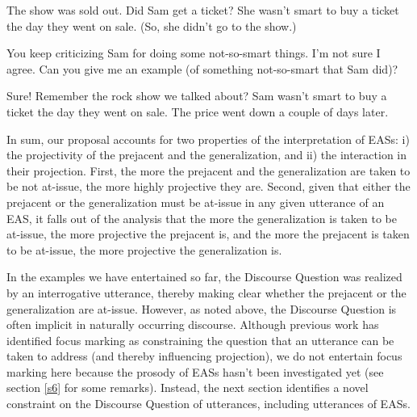 \documentclass[11pt,fleqn]{article}
\newcommand{\6}{\mbox{$[\hspace*{-.6mm}[$}}
\newcommand{\9}{\mbox{$]\hspace*{-.6mm}]$}}
\begin{document}
\begin{exe}
\ex\label{ai2}

\begin{xlist}
\ex
\begin{xlist}
 The show was sold out. Did Sam get a ticket?
 She wasn't smart to buy a ticket the day they went on sale. (So, she didn't go to the show.)
\end{xlist}

\ex
\begin{xlist}

 You keep criticizing Sam for doing some not-so-smart things. I'm not sure I agree. Can you give me an example (of something not-so-smart that Sam did)?


 Sure! Remember the rock show we talked about? Sam wasn't smart to buy a ticket the day they went on sale. The price went down a couple of days later.

%

\end{xlist}

\end{xlist}
\end{exe}
In sum, our proposal accounts for two properties of the interpretation of EASs: i) the projectivity of the prejacent and the generalization, and ii) the interaction in their projection. First, the more the prejacent and the generalization are taken to be not at-issue, the more highly projective they are. Second, given that either the prejacent or the generalization must be at-issue in any given utterance of an EAS, it falls out of the analysis that the more the generalization is taken to be at-issue, the more projective the prejacent is, and the more the prejacent is taken to be at-issue, the more projective the generalization is.

In the examples we have entertained so far, the Discourse Question was realized by an interrogative utterance, thereby making clear whether the prejacent or the generalization are at-issue. However, as noted above, the Discourse Question is often implicit in naturally occurring discourse. Although previous work has identified focus marking as constraining the question that an utterance can be taken to address (and thereby influencing projection), we do not entertain focus marking here because the prosody of EASs hasn't been investigated yet (see section \ref{s6} for some remarks). Instead, the next section identifies a novel constraint on the Discourse Question of utterances, including utterances of EASs.
\end{document}
